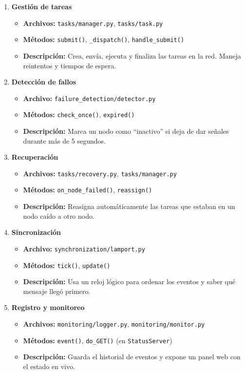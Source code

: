 \documentclass{article}
\begin{document}
\begin{enumerate}
    \item \textbf{Gestión de tareas}
    \begin{itemize}
        \item \textbf{Archivos:} \texttt{tasks/manager.py}, \texttt{tasks/task.py}
        \item \textbf{Métodos:} \texttt{submit()}, \texttt{\_dispatch()}, \texttt{handle\_submit()}
        \item \textbf{Descripción:} Crea, envía, ejecuta y finaliza las tareas en la red. Maneja reintentos y tiempos de espera.
    \end{itemize}

    \item \textbf{Detección de fallos}
    \begin{itemize}
        \item \textbf{Archivo:} \texttt{failure\_detection/detector.py}
        \item \textbf{Métodos:} \texttt{check\_once()}, \texttt{expired()}
        \item \textbf{Descripción:} Marca un nodo como ``inactivo'' si deja de dar señales durante más de 5 segundos.
    \end{itemize}

    \item \textbf{Recuperación}
    \begin{itemize}
        \item \textbf{Archivos:} \texttt{tasks/recovery.py}, \texttt{tasks/manager.py}
        \item \textbf{Métodos:} \texttt{on\_node\_failed()}, \texttt{reassign()}
        \item \textbf{Descripción:} Reasigna automáticamente las tareas que estaban en un nodo caído a otro nodo.
    \end{itemize}

    \item \textbf{Sincronización}
    \begin{itemize}
        \item \textbf{Archivo:} \texttt{synchronization/lamport.py}
        \item \textbf{Métodos:} \texttt{tick()}, \texttt{update()}
        \item \textbf{Descripción:} Usa un reloj lógico para ordenar los eventos y saber qué mensaje llegó primero.
    \end{itemize}

    \item \textbf{Registro y monitoreo}
    \begin{itemize}
        \item \textbf{Archivos:} \texttt{monitoring/logger.py}, \texttt{monitoring/monitor.py}
        \item \textbf{Métodos:} \texttt{event()}, \texttt{do\_GET()} (en \texttt{StatusServer})
        \item \textbf{Descripción:} Guarda el historial de eventos y expone un panel web con el estado en vivo.
    \end{itemize}


\end{enumerate}
\end{document}
